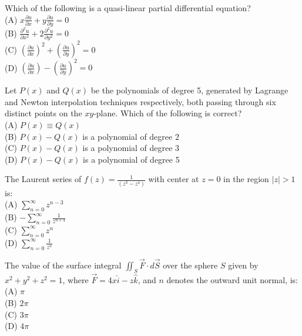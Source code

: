 \iffalse
\chapter{2018}
\author{EE24BTECH11004}
\section{xe}
\fi



    \item Which of the following is a quasi-linear partial differential equation? \\
    (A) $x \frac{\partial u}{\partial x} + y \frac{\partial u}{\partial y} = 0$ \\
    (B) $\frac{\partial^2 u}{\partial x^2} + 2 \frac{\partial^2 u}{\partial y^2} = 0$ \\
    (C) $\left( \frac{\partial u}{\partial x} \right)^2 + \left( \frac{\partial u}{\partial y} \right)^2 = 0$ \\
    (D) $\left( \frac{\partial u}{\partial x} \right) - \left( \frac{\partial u}{\partial y} \right)^2 = 0$

    \item Let $P(x)$ and $Q(x)$ be the polynomials of degree 5, generated by Lagrange and Newton interpolation techniques respectively, both passing through six distinct points on the $xy$-plane. Which of the following is correct? \\
    (A) $P(x) \equiv Q(x)$ \\
    (B) $P(x) - Q(x)$ is a polynomial of degree 2 \\
    (C) $P(x) - Q(x)$ is a polynomial of degree 3 \\
    (D) $P(x) - Q(x)$ is a polynomial of degree 5

    \item The Laurent series of $f(z) = \frac{1}{(z^3 - z^4)}$ with center at $z = 0$ in the region $|z| > 1$ is: \\
    (A) $\sum_{n=0}^{\infty} z^{n-3}$ \\
    (B) $-\sum_{n=0}^{\infty} \frac{1}{z^{n+4}}$ \\
    (C) $\sum_{n=0}^{\infty} z^n$ \\
    (D) $\sum_{n=0}^{\infty} \frac{1}{z^n}$

    \item The value of the surface integral $\iint_S \vec{F} \cdot d\vec{S}$ over the sphere $S$ given by $x^2 + y^2 + z^2 = 1$, where $\vec{F} = 4x \hat{i} - z \hat{k}$, and $n$ denotes the outward unit normal, is: \\
    (A) $\pi$ \\
    (B) $2\pi$ \\
    (C) $3\pi$ \\
    (D) $4\pi$

